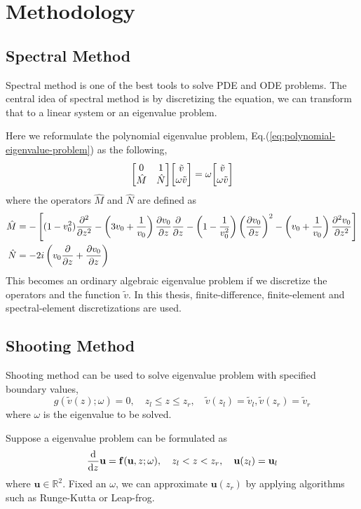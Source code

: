 \chapter{Methodology}
\section{Spectral Method}
Spectral method is one of the best tools to solve PDE and ODE problems. \cite{trefethen_spectral_nodate} The central idea of spectral method is by discretizing the equation, we can transform that to a linear system or an eigenvalue problem.

Here we reformulate the polynomial eigenvalue problem, Eq.(\ref{eq:polynomial-eigenvalue-problem}) as the following, 
\begin{equation} \label{eq:eigenvalue-problem}
	\mqty[ 0 & 1\\ \hat{M} & \hat{N} ]\mqty[ \tilde{v}\\ \omega \tilde{v}] = \omega\mqty[ \tilde{v}\\ \omega \tilde{v}]
\end{equation}
where the operators $\hat{M}$ and $\hat{N}$ are defined as
\begin{align*}
	\hat{M} &= -\left[(1-v_0^2)\pdv[2]{}{z} 
	-\left(3v_0 + \frac{1}{v_0}\right)\pdv{v_0}{z}\pdv{}{z} 
	- \left(1-\frac{1}{v_0^2}\right)\left(\pdv{v_0}{z}\right)^2 
	- \left(v_0+\frac{1}{v_0}\right)\pdv[2]{v_0}{z}\right] \\
	\hat{N} &= -2i\left(v_0\pdv{}{z} +\pdv{v_0}{z} \right) 
\end{align*}
This becomes an ordinary algebraic eigenvalue problem if we discretize the operators and the function $\tilde{v}$. In this thesis, finite-difference, finite-element and spectral-element discretizations are used.

\section{Shooting Method}
Shooting method can be used to solve eigenvalue problem with specified boundary values,
\begin{equation} \label{eq:boundary-eigenvalue-problem}
g(\tilde{v}(z);\omega) = 0,
\quad
z_l \leq z \leq z_r,
\quad
\tilde{v}(z_l) = \tilde{v}_l, \tilde{v}(z_r) = \tilde{v}_r
\end{equation}
where $\omega$ is the eigenvalue to be solved.

Suppose a eigenvalue problem can be formulated as
\[ \dv{z}\mathbf{u} = \mathbf{f}(\mathbf{u},z;\omega),
\quad
z_l<z<z_r,
\quad
\mathbf{u}(z_l) = \mathbf{u}_l
\]
where $\mathbf{u}\in\mathbb{R}^2$. Fixed an $\omega$, we can approximate $\mathbf{u}(z_r)$ by applying algorithms such as Runge-Kutta or Leap-frog.

